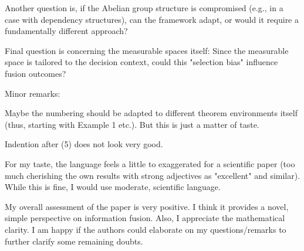 \documentclass[letterpaper]{article} %
\begin{document}
\begin{CJK*}{UTF8}{gbsn}
Another question is, if the Abelian group structure is compromised (e.g., in a case with dependency structures), can the framework adapt, or would it require a fundamentally different approach?

Final question is concerning the measurable spaces itself: Since the measurable space is tailored to the decision context, could this "selection bias" influence fusion outcomes?

Minor remarks:

Maybe the numbering should be adapted to different theorem environments itself (thus, starting with Example 1 etc.). But this is just a matter of taste.

Indention after (5) does not look very good.

For my taste, the language feels a little to exaggerated for a scientific paper (too much cherishing the own results with strong adjectives as "excellent" and similar). While this is fine, I would use moderate, scientific language.

My overall assessment of the paper is very positive. I think it provides a novel, simple perspective on information fusion. Also, I appreciate the mathematical clarity. I am happy if the authors could elaborate on my questions/remarks to further clarify some remaining doubts.









\end{CJK*}
\end{document}
